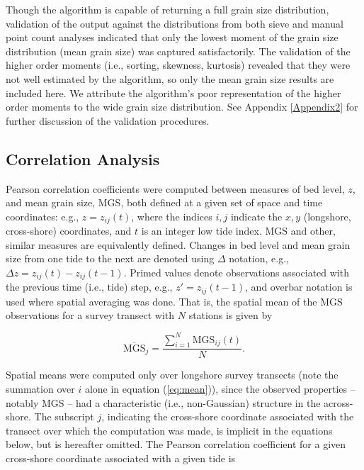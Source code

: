 Though the algorithm is capable of returning a full grain size distribution, validation of the output against the distributions from both sieve and manual point count analyses \citep[see][or Appendix \ref{Appendix2} for a description of the point count method]{Barnard_etal2007, Buscombe_etal2010} indicated that only the lowest moment of the grain size distribution (mean grain size) was captured satisfactorily. The validation of the higher order moments (i.e., sorting, skewness, kurtosis) revealed that they were not well estimated by the algorithm, so only the mean grain size results are included here. We attribute the algorithm's poor representation of the higher order moments to the wide grain size distribution. See Appendix \ref{Appendix2} for further discussion of the validation procedures.


\subsection{Correlation Analysis}\label{subsec:ch3_correlation_methods}

Pearson correlation coefficients were computed between measures of bed level, $z$, and mean grain size, MGS, both defined at a given set of space and time coordinates: e.g., $z=z_{ij}(t)$, where the indices $i,j$ indicate the $x,y$ (longshore, cross-shore) coordinates, and $t$ is an integer low tide index. MGS and other, similar measures are equivalently defined. Changes in bed level and mean grain size from one tide to the next are denoted using $\Delta$ notation, e.g., $\Delta z = z_{ij}(t) - z_{ij}(t-1)$. Primed values denote observations associated with the previous time (i.e., tide) step, e.g., $z'=z_{ij}(t-1)$, and overbar notation is used where spatial averaging was done. That is, the spatial mean of the MGS observations for a survey transect with $N$ stations is given by 

\begin{equation}\label{eq:mean}
\overline{\mathrm{MGS}}_j = \frac{\sum_{i=1}^{N} \mathrm{MGS}_{ij}(t)}{N}. 
\end{equation}

\noindent Spatial means were computed only over longshore survey transects (note the summation over $i$ alone in equation (\ref{eq:mean})), since the observed properties -- notably MGS -- had a characteristic (i.e., non-Gaussian) structure in the across-shore. The subscript $j$, indicating the cross-shore coordinate associated with the transect over which the computation was made, is implicit in the equations below, but is hereafter omitted. The Pearson correlation coefficient for a given cross-shore coordinate associated with a given tide is

